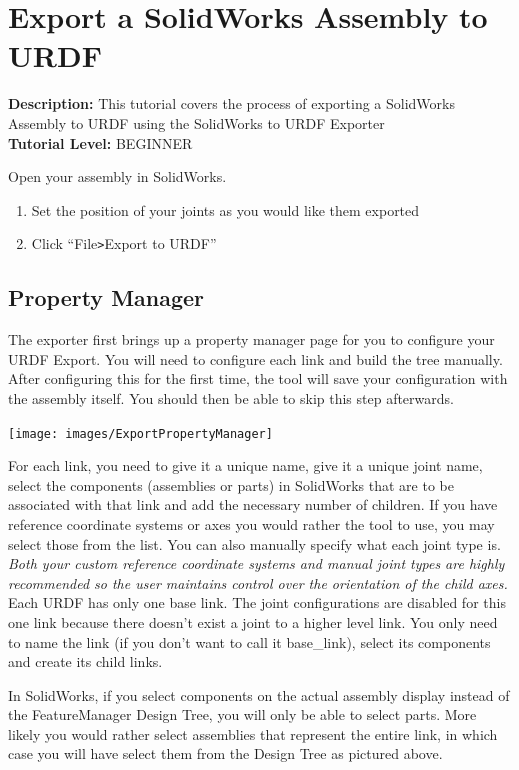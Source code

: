 \section{Export a SolidWorks Assembly to URDF}\label{sec:ExportSW}
\textbf{Description:} This tutorial covers the process of exporting a SolidWorks Assembly to URDF using the SolidWorks to URDF Exporter
\\

\noindent \textbf{Tutorial Level:} BEGINNER


\noindent Open your assembly in SolidWorks. 
\begin{enumerate}
\item Set the position of your joints as you would like them exported 
\item Click ``File\verb|>|Export to URDF'' 
\end{enumerate}

\subsection{Property Manager}
\indent The exporter first brings up a property manager page for you to configure your URDF Export. You will need to configure each link and build the tree manually. After configuring this for the first time, the tool will save your configuration with the assembly itself. You should then be able to skip this step afterwards. 

\texttt{[image: images/ExportPropertyManager]}

For each link, you need to give it a unique name, give it a unique joint name, select the components (assemblies or parts) in SolidWorks that are to be associated with that link and add the necessary number of children. If you have reference coordinate systems or axes you would rather the tool to use, you may select those from the list. You can also manually specify what each joint type is. \emph{Both your custom reference coordinate systems and manual joint types are highly recommended so the user maintains control over the orientation of the child axes.} Each URDF has only one base link. The joint configurations are disabled for this one link because there doesn't exist a joint to a higher level link. You only need to name the link (if you don't want to call it base\_link), select its components and create its child links. 

In SolidWorks, if you select components on the actual assembly display instead of the FeatureManager Design Tree, you will only be able to select parts. More likely you would rather select assemblies that represent the entire link, in which case you will have select them from the Design Tree as pictured above. 

